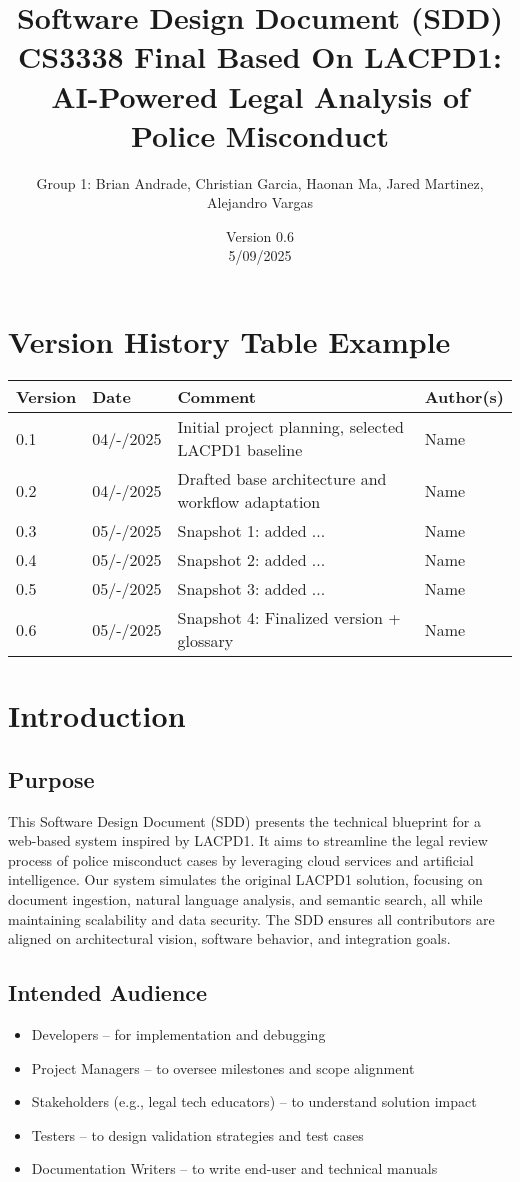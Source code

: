 \documentclass[11pt]{article}
\title{Software Design Document (SDD) \\
CS3338 Final Based On LACPD1: AI-Powered Legal Analysis of Police Misconduct}
\author{Group 1: Brian Andrade, Christian Garcia, Haonan Ma, Jared Martinez, Alejandro Vargas}
\date{Version 0.6 \\ 5/09/2025}
\begin{document}
\maketitle
\thispagestyle{empty}
\newpage

\tableofcontents
\thispagestyle{empty}
\newpage

\section*{Version History Table Example}
\begin{longtable}{|l|l|p{8cm}|l|}
\hline
\textbf{Version} & \textbf{Date} & \textbf{Comment} & \textbf{Author(s)} \\
\hline
0.1 & 04/-/2025 & Initial project planning, selected LACPD1 baseline & Name \\
0.2 & 04/-/2025 & Drafted base architecture and workflow adaptation & Name \\
0.3 & 05/-/2025 & Snapshot 1: added ...  & Name \\
0.4 & 05/-/2025 & Snapshot 2: added ...  & Name \\
0.5 & 05/-/2025 & Snapshot 3: added ...  & Name \\
0.6 & 05/-/2025 & Snapshot 4: Finalized version + glossary & Name \\
\hline
\end{longtable}

\newpage
\section{Introduction}
\subsection{Purpose}
This Software Design Document (SDD) presents the technical blueprint for a web-based system inspired by LACPD1. It aims to streamline the legal review process of police misconduct cases by leveraging cloud services and artificial intelligence. Our system simulates the original LACPD1 solution, focusing on document ingestion, natural language analysis, and semantic search, all while maintaining scalability and data security. The SDD ensures all contributors are aligned on architectural vision, software behavior, and integration goals.

\subsection{Intended Audience}
\begin{itemize}
\item Developers – for implementation and debugging
\item Project Managers – to oversee milestones and scope alignment
\item Stakeholders (e.g., legal tech educators) – to understand solution impact
\item Testers – to design validation strategies and test cases
\item Documentation Writers – to write end-user and technical manuals
\end{itemize}
\end{document}

